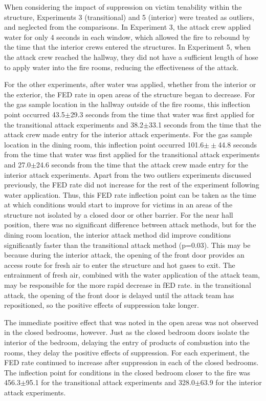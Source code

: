 \documentclass[12pt,oneside]{book}
\begin{document}
When considering the impact of suppression on victim tenability within the structure, Experiments 3 (transitional) and 5 (interior) were treated as outliers, and neglected from the comparisons. In Experiment 3, the attack crew applied water for only 4 seconds in each window, which allowed the fire to rebound by the time that the interior crews entered the structures. In Experiment 5, when the attack crew reached the hallway, they did not have a sufficient length of hose to apply water into the fire rooms, reducing the effectiveness of the attack. 

For the other experiments, after water was applied, whether from the interior or the exterior, the FED rate in open areas of the structure began to decrease. For the gas sample location in the hallway outside of the fire rooms, this inflection point occurred 43.5$\pm$29.3 seconds from the time that water was first applied for the transitional attack experiments and 38.2$\pm$33.1 seconds from the time that the attack crew made entry for the interior attack experiments. For the gas sample location in the dining room, this inflection point occurred 101.6$\pm\pm$44.8 seconds from the time that water was first applied for the transitional attack experiments and 27.0$\pm$24.6 seconds from the time that the attack crew made entry for the interior attack experiments. Apart from the two outliers experiments discussed previously, the FED rate did not increase for the rest of the experiment following water application. Thus, this FED rate inflection point can be taken as the time at which conditions would start to improve for victims in an areas of the structure not isolated by a closed door or other barrier. For the near hall position, there was no significant difference between attack methods, but for the dining room location, the interior attack method did improve conditions significantly faster than the transitional attack method (p=0.03). This may be because during the interior attack, the opening of the front door provides an access route for fresh air to enter the structure and hot gases to exit. The entrainment of fresh air, combined with the water application of the attack team, may be responsible for the more rapid decrease in fED rate. in the transitional attack, the opening of the front door is delayed until the attack team has repositioned, so the positive effects of suppression take longer.

The immediate positive effect that was noted in the open areas was not observed in the closed bedrooms, however. Just as the closed bedroom doors isolate the interior of the bedroom, delaying the entry of products of combustion into the rooms, they delay the positive effects of suppression. For each experiment, the FED rate continued to increase after suppression in each of the closed bedrooms. The inflection point for conditions in the closed bedroom closer to the fire was 456.3$\pm$95.1 for the transitional attack experiments and 328.0$\pm$63.9 for the interior attack experiments.  
\end{document}
